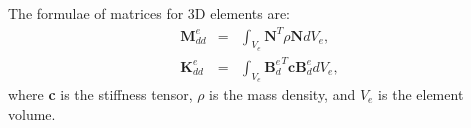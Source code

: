 \documentclass[sensors,article,accept,moreauthors,pdftex]{Definitions/mdpi}
\begin{document}
\begin{paracol}{2}
\dataavailability{\hl{~}%
} 

\appendixstart
\appendix


\section{}
\label{app:matrices}
The formulae of matrices for 3D elements are:
\begin{eqnarray}
\textbf{M}_{dd}^e & = & \int_{V_e}\textbf{N}^T\rho \textbf{N} dV_e,\\
\textbf{K}_{dd}^e & = & \int_{V_e}{\textbf{B}_d^e}^T\textbf{c}\textbf{B}_d^edV_e,
\end{eqnarray}
where \textbf{c} is the stiffness tensor, \(\rho\) is the mass density, and \(V_e\) is the element volume.


\end{paracol}
\end{document}
